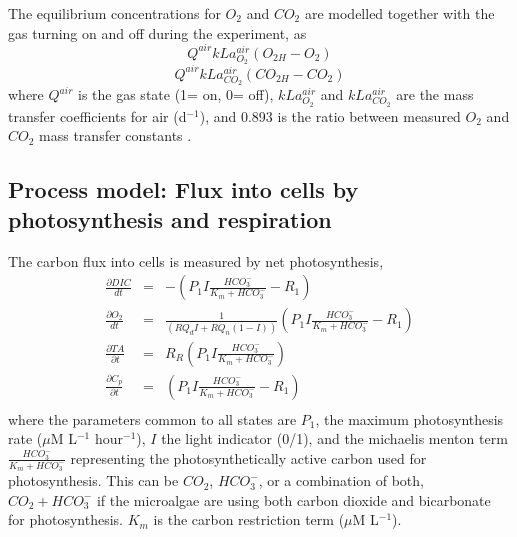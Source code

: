 \documentclass{ruthesis}
\begin{document}
The equilibrium concentrations for $O_2$ and $CO_2$ are modelled together with the gas turning on and off during the experiment, as
\begin{equation}
 Q^{air} kLa_{O_2}^{air} (O_{2H} - O_{2})
\end{equation}
\begin{equation}
 Q^{air} kLa_{CO_2}^{air} (CO_{2H} - CO_{2})
\end{equation}
where $Q^{air}$ is the gas state (1= on, 0= off), $kLa_{O_2}^{air}$ and $kLa_{CO_2}^{air}$ are the mass transfer coefficients for air (d$^{-1}$), and 0.893 is the ratio between measured $O_2$ and $CO_2$ mass transfer constants \cite{grima1993gas}.



\subsection{Process model: Flux into cells by photosynthesis and respiration}

The carbon flux into cells is measured by net photosynthesis,
\begin{align}
\frac{\partial DIC}{dt} &=&  -(P_1 I \frac{HCO_3^-}{K_m + HCO_3^-}  - R_1) 
\\
\frac{\partial O_2}{dt}	&=&  \frac{1}{(RQ_d I + RQ_n(1-I))}(P_1 I \frac{HCO_3^-}{K_m + HCO_3^-}  - R_1)
\\
\frac{\partial TA}{\partial t}  &=&      R_R (P_1 I \frac{HCO_3^-}{K_m + HCO_3^-}) \phantom{- R_1)}
\\
\frac{\partial C_p}{\partial t} &=& 	 (P_1 I \frac{HCO_3^-}{K_m + HCO_3^-} - R_1) 
\\\nonumber
\end{align} 
where the parameters common to all states are $P_1$, the maximum photosynthesis rate ($\mu$M L$^{-1}$ hour$^{-1}$), $I$ the light indicator (0/1), and the michaelis menton term $\frac{HCO_3^-}{K_m + HCO_3^-}$ representing the photosynthetically active carbon used for photosynthesis. This can be $CO_2$, $HCO_3^-$, or a combination of both, $CO_2 + HCO_3^-$ if the microalgae are using both carbon dioxide and bicarbonate for photosynthesis. $K_m$ is the carbon restriction term ($\mu$M L$^{-1}$).
\end{document}
